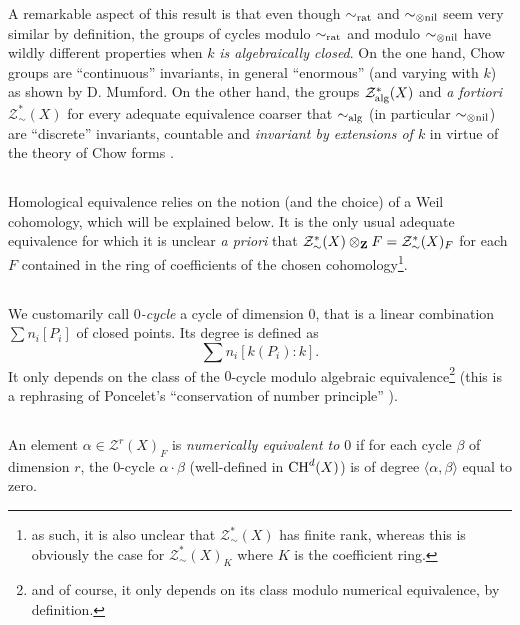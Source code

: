 \documentclass[../main.tex]{subfiles}
\begin{document}
A remarkable aspect of this result is that even though $\sim_{\mathrm{rat}}$ and $\sim_{\otimes\mathrm{nil}}$ seem very similar by definition, the groups of cycles modulo $\sim_{\mathrm{rat}}$ and modulo $\sim_{\otimes\mathrm{nil}}$ have wildly different properties when $k$ \emph{is algebraically closed}.
On the one hand, Chow groups are \enquote{continuous} invariants, in general \enquote{enormous} (and varying with $k$) as shown by D. Mumford.
On the other hand, the groups $\mathcal{Z}^*_{\mathrm{alg}}(X)$ and \emph{a fortiori} $\mathcal{Z}^*_{\sim}(X)$ for every adequate equivalence coarser that $\sim_{\mathrm{alg}}$ (in particular $\sim_{\otimes\mathrm{nil}}$) are \enquote{discrete} invariants, countable and \emph{invariant by extensions of $k$} in virtue of the theory of Chow forms \cite{Kl70a}.

\subsection{} Homological equivalence relies on the notion (and the choice) of a Weil cohomology, which will be explained below. It is the only usual adequate equivalence for which it is unclear \emph{a priori} that $\mathcal{Z}^*_{\sim}(X) \otimes_{\mathbf{Z}} F = \mathcal{Z}^*_{\sim}(X)_F$ for each $F$ contained in the ring of coefficients of the chosen cohomology\footnote{as such, it is also unclear that $\mathcal{Z}^*_{\sim}(X)$ has finite rank, whereas this is obviously the case for $\mathcal{Z}^*_{\sim}(X)_K$ where $K$ is the coefficient ring.}.

\subsection{} We customarily call \emph{$0$-cycle} a cycle of dimension $0$, that is a linear combination $\sum n_i [P_i]$ of closed points. Its degree is defined as
$$\sum n_i [k(P_i) : k].$$
It only depends on the class of the $0$-cycle modulo algebraic equivalence\footnote{and of course, it only depends on its class modulo numerical equivalence, by definition.} (this is a rephrasing of Poncelet's \enquote{conservation of number principle} \cite{fu84}).

\subsection{} An element $\alpha \in \mathcal{Z}^r(X)_F$ is \emph{numerically equivalent to $0$} if for each cycle $\beta$ of dimension $r$, the $0$-cycle $\alpha \cdot \beta$ (well-defined in $\operatorname{CH}^d(X)$) is of degree $\langle \alpha, \beta\rangle$ equal to zero.
\end{document}

